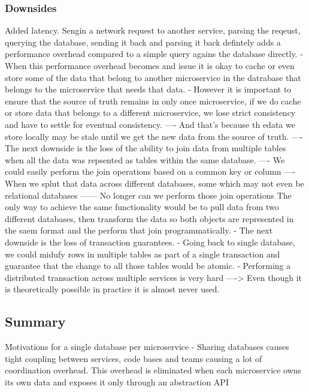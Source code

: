 \documentclass[a4paper, 11pt]{book}
\begin{document}
    \subsubsection{Downsides}
    Added latency. Sengin a network request to another service, parsing the reqeust, querying the database, sending it back and parsing it back defintely adds a performance overhead compared to a simple query agains the database directly.
    - When this performance overhead becomes and issue it is okay to cache or even store some of the data that belong to another microservice in the datrabase that belongs to the microservice that needs that data.
    - However it is important to ensure that the source of truth remains in only once microservice, if we do cache or store data that belongs to a different microservice, we lose strict consistency and have to settle for eventual consistency.
    ---- And that's because th edata we store locally may be stale until we get the new data from the source of truth.
    ---- The next downside is the loss of the ability to join data from multiple tables when all the data was repsented as tables within the same database.
    ---- We could easily perform the join operations based on a common key or column
    ---- When we splut that data across different databases, some which may not even be relational databases
    ------ No longer can we perform those join operations
    The only way to achieve the same functionality would be to pull data from two different databases, then transform the data so both objects are represented in the saem format and the perform that join programmatically.
    - The next downside is the loss of transaction guarantees.
    - Going back to single database, we could midufy rows in multiple tables as part of a single transaction and guarantee that the change to all those tables would be atomic.
    - Performing a distributed transaction across multiple services is very hard
    ----> Even though it is theoretically possible in practice it is almost never used.

    \subsection{Summary}
    Motivations for a single database per microservice
    - Sharing databases causes tight coupling between services, code bases and teams causing a lot of coordination overhead.
    This overhead is eliminated when each microservice owns its own data and exposes it only through an abstraction API
\end{document}
